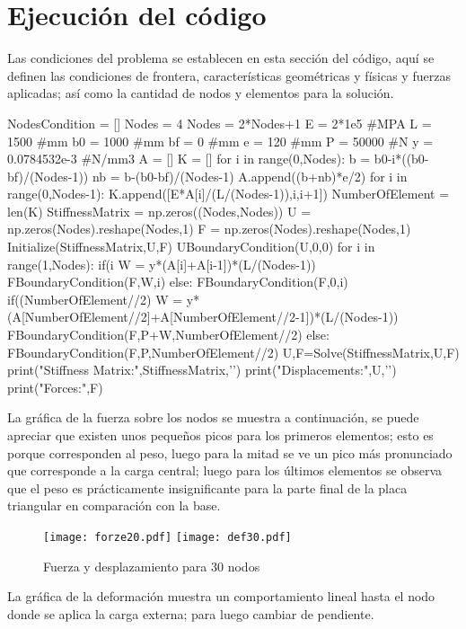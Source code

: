 \documentclass[12pt,a3paper]{article}
\begin{document}
\section{Ejecución del código}
Las condiciones del problema se establecen en esta sección del código, aquí se definen las condiciones de frontera, características geométricas y físicas y fuerzas aplicadas; así como la cantidad de nodos y elementos para la solución.
\begin{pyglist}[language=python,caption={Condiciones del problema},style=pastie]
NodesCondition = []
Nodes = 4
Nodes = 2*Nodes+1
E = 2*1e5 #MPA
L = 1500 #mm
b0 = 1000 #mm
bf = 0 #mm
e = 120 #mm
P = 50000 #N
y = 0.0784532e-3 #N/mm3
A = []
K = []
for i in range(0,Nodes):
    b = b0-i*((b0-bf)/(Nodes-1))
	nb = b-(b0-bf)/(Nodes-1)    
    A.append((b+nb)*e/2)
for i in range(0,Nodes-1):
    K.append([E*A[i]/(L/(Nodes-1)),i,i+1])
NumberOfElement = len(K)
StiffnessMatrix = np.zeros((Nodes,Nodes))
U = np.zeros(Nodes).reshape(Nodes,1)
F = np.zeros(Nodes).reshape(Nodes,1)
Initialize(StiffnessMatrix,U,F)
UBoundaryCondition(U,0,0)
for i in range(1,Nodes):
    if(i%
        W = y*(A[i]+A[i-1])*(L/(Nodes-1))
        FBoundaryCondition(F,W,i)
    else:
        FBoundaryCondition(F,0,i)     
if((NumberOfElement//2)%
    W = y*(A[NumberOfElement//2]+A[NumberOfElement//2-1])*(L/(Nodes-1))
    FBoundaryCondition(F,P+W,NumberOfElement//2)
else:
    FBoundaryCondition(F,P,NumberOfElement//2)
U,F=Solve(StiffnessMatrix,U,F)
print("Stiffness Matrix:\n",StiffnessMatrix,'\n')
print("Displacements:\n",U,'\n')
print("Forces:\n",F)
\end{pyglist}
La gráfica de la fuerza sobre los nodos se muestra a continuación, se puede apreciar que existen unos pequeños picos para los primeros elementos; esto es porque corresponden al peso, luego para la mitad se ve un pico más pronunciado que corresponde a la carga central; luego para los últimos elementos se observa que el peso es prácticamente insignificante para la parte final de la placa triangular en comparación con la base.
\begin{figure}[H]
\begin{center}
\texttt{[image: forze20.pdf]}
\texttt{[image: def30.pdf]}
\caption{Fuerza y desplazamiento para 30 nodos}
\end{center}
\end{figure}
La gráfica de la deformación muestra un comportamiento lineal hasta el nodo donde se aplica la carga externa; para luego cambiar de pendiente.
\end{document}
